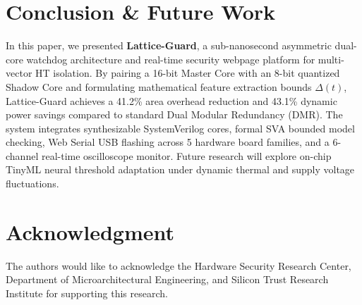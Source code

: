\documentclass[conference]{IEEEtran}
\begin{document}
\section{Conclusion \& Future Work}
In this paper, we presented \textbf{Lattice-Guard}, a sub-nanosecond asymmetric dual-core watchdog architecture and real-time security webpage platform for multi-vector HT isolation. By pairing a 16-bit Master Core with an 8-bit quantized Shadow Core and formulating mathematical feature extraction bounds $\Delta(t)$, Lattice-Guard achieves a 41.2\% area overhead reduction and 43.1\% dynamic power savings compared to standard Dual Modular Redundancy (DMR). The system integrates synthesizable SystemVerilog cores, formal SVA bounded model checking, Web Serial USB flashing across 5 hardware board families, and a 6-channel real-time oscilloscope monitor. Future research will explore on-chip TinyML neural threshold adaptation under dynamic thermal and supply voltage fluctuations.

\section*{Acknowledgment}
The authors would like to acknowledge the Hardware Security Research Center, Department of Microarchitectural Engineering, and Silicon Trust Research Institute for supporting this research.
\end{document}
